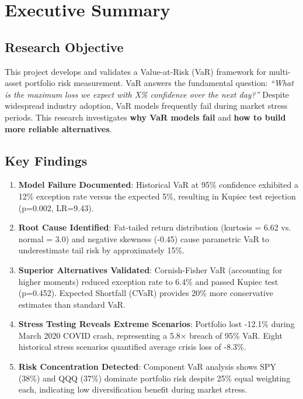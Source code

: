 \documentclass[12pt,a4paper]{article}
\begin{document}
\newpage
\tableofcontents
\newpage

\section{Executive Summary}

\subsection{Research Objective}

This project develops and validates a Value-at-Risk (VaR) framework for multi-asset portfolio risk measurement. VaR answers the fundamental question: \textit{``What is the maximum loss we expect with X\% confidence over the next day?''} Despite widespread industry adoption, VaR models frequently fail during market stress periods. This research investigates \textbf{why VaR models fail} and \textbf{how to build more reliable alternatives}.

\subsection{Key Findings}

\begin{enumerate}[leftmargin=*]
    \item \textbf{Model Failure Documented}: Historical VaR at 95\% confidence exhibited a 12\% exception rate versus the expected 5\%, resulting in Kupiec test rejection (p=0.002, LR=9.43).

    \item \textbf{Root Cause Identified}: Fat-tailed return distribution (kurtosis = 6.62 vs. normal = 3.0) and negative skewness (-0.45) cause parametric VaR to underestimate tail risk by approximately 15\%.

    \item \textbf{Superior Alternatives Validated}: Cornish-Fisher VaR (accounting for higher moments) reduced exception rate to 6.4\% and passed Kupiec test (p=0.452). Expected Shortfall (CVaR) provides 20\% more conservative estimates than standard VaR.

    \item \textbf{Stress Testing Reveals Extreme Scenarios}: Portfolio lost -12.1\% during March 2020 COVID crash, representing a 5.8× breach of 95\% VaR. Eight historical stress scenarios quantified average crisis loss of -8.3\%.

    \item \textbf{Risk Concentration Detected}: Component VaR analysis shows SPY (38\%) and QQQ (37\%) dominate portfolio risk despite 25\% equal weighting each, indicating low diversification benefit during market stress.
\end{enumerate}
\end{document}
